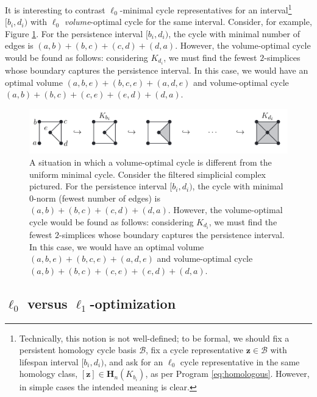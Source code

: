 \documentclass[11pt,onecolumn]{article}
\newcommand{\Homologies}[0]{\mathbf{H}}
\newcommand{\cycle}{{\mathbf z}}
\newcommand{\fig}{Figure }
\newcommand{\pr}{Program }
\newcommand{\hcyclebasis}{\mathcal B}
\theoremstyle{plain}
\theoremstyle{definition}
\begin{document}
It is interesting to contrast $\ell_0$-minimal cycle representatives for an interval\footnote{Technically, this notion is not well-defined; to be formal, we should fix a persistent homology cycle basis $\hcyclebasis$, fix a cycle representative $\cycle \in \hcyclebasis$ with lifespan interval $[b_i, d_i)$, and ask for an $\ell_0$ cycle representative in the same homology class, $[\cycle] \in \Homologies_n(K_{b_i})$, as per \pr \eqref{eq:homologous}.  However, in simple cases the intended meaning is clear.} $[b_i, d_i)$ with  $\ell_0$ \emph{volume}-optimal cycle for the same interval.  Consider, for example, \fig \ref{fig:volumeoptimal}.  For the persistence interval $[b_i,d_i)$, the cycle with minimal number of edges is $(a,b) + (b,c) + (c,d)  + (d,a)$. However, the volume-optimal cycle would be found as follows: considering $K_{d_i}$, we must find the fewest $2$-simplices whose boundary captures the persistence interval. In this case, we would have an optimal volume  $(a,b,e) + (b,c,e) + (a,d,e)$ and volume-optimal cycle $(a,b)+ (b,c) + (c,e) + (e,d)+ (d,a)$.

 \begin{figure}[h!]
\begin{center}
\includegraphics[width=1\textwidth]{figures/volumeexample.jpg}
\end{center}
\caption{A situation in which a volume-optimal cycle is different from the uniform minimal cycle. Consider the filtered simplicial complex pictured. For the persistence interval $[b_i,d_i)$, the cycle with minimal $0$-norm (fewest number of edges) is $(a,b) + (b,c) + (c,d)  + (d,a)$.
However, the volume-optimal cycle would be found as follows: considering $K_{d_i}$, we must find the fewest $2$-simplices whose boundary captures the persistence interval. In this case, we would have an optimal volume $(a,b,e) + (b,c,e) + (a,d,e)$ and volume-optimal cycle $(a,b) + (b,c) + (c,e) + (e,d) + (d,a)$. 
}\label{fig:volumeoptimal}
\end{figure} 


\subsection{$\ell_0$ versus $\ell_1$-optimization} \label{secl0l1}
\end{document}
